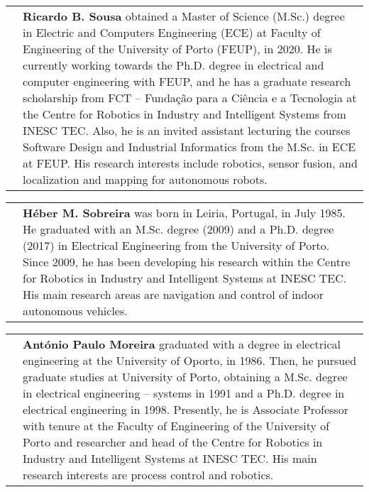 \documentclass[10pt,a4paper,notitlepage,twocolumn,oneside]{article}
\begin{document}
\begin{tabular}{p{} p{}}
\raisebox{-0.925\totalheight}{\texttt{[image: figures/sousa.jpg]}} &
\textbf{Ricardo B. Sousa} obtained a Master of Science (M.Sc.) degree in Electric and Computers Engineering (ECE) at Faculty of Engineering of the University of Porto (FEUP), in 2020.
He is currently working towards the Ph.D. degree in electrical and computer engineering with FEUP, and he has a graduate research scholarship from FCT -- Fundação para a Ciência e a Tecnologia at the Centre for Robotics in Industry and Intelligent Systems from INESC TEC.
Also, he is an invited assistant lecturing the courses Software Design and Industrial Informatics from the M.Sc. in ECE at FEUP.
His research interests include robotics, sensor fusion, and localization and mapping for autonomous robots.\\
\end{tabular}

\newpage

\begin{tabular}{p{} p{}}
\raisebox{-0.925\totalheight}{\texttt{[image: figures/sobreira.jpg]}} &
\textbf{H\'{e}ber M. Sobreira} was born in Leiria, Portugal, in July 1985. He graduated with an M.Sc. degree (2009) and a Ph.D. degree (2017) in Electrical Engineering from the University of Porto. Since 2009, he has been developing his research within the Centre for Robotics in Industry and Intelligent Systems at INESC TEC. His main research areas are navigation and control of indoor autonomous vehicles.\\
\end{tabular}


\begin{tabular}{p{} p{}}
\raisebox{-0.925\totalheight}{\texttt{[image: figures/moreira.png]}} &
\textbf{Ant\'{o}nio Paulo Moreira} graduated with a degree in electrical engineering at the University of Oporto, in 1986. Then, he pursued graduate studies at University of Porto, obtaining a M.Sc. degree in electrical engineering -- systems in 1991 and a Ph.D. degree in electrical engineering in 1998. Presently, he is Associate Professor with tenure at the Faculty of Engineering of the University of Porto and researcher and head of the Centre for Robotics in Industry and Intelligent Systems at INESC TEC. His main research interests are process control and robotics.\\
\end{tabular}




\cleardoublepage


\end{document}

